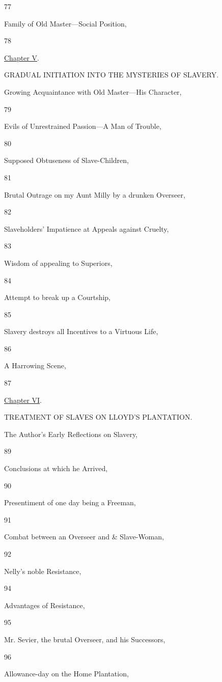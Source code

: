 77

Family of Old Master---Social Position,

78

\href{/wiki/My_Bondage_and_My_Freedom_(1855)/Chapter_V}{Chapter V}.

GRADUAL INITIATION INTO THE MYSTERIES OF SLAVERY.

Growing Acquaintance with Old Master---His Character,

79

Evils of Unrestrained Passion---A Man of Trouble,

80

Supposed Obtuseness of Slave-Children,

81

Brutal Outrage on my Aunt Milly by a drunken Overseer,

82

Slaveholders' Impatience at Appeals against Cruelty,

83

Wisdom of appealing to Superiors,

84

Attempt to break up a Courtship,

85

Slavery destroys all Incentives to a Virtuous Life,

86

A Harrowing Scene,

87

\href{/wiki/My_Bondage_and_My_Freedom_(1855)/Chapter_VI}{Chapter VI}.

TREATMENT OF SLAVES ON LLOYD'S PLANTATION.

The Author's Early Reflections on Slavery,

89

Conclusions at which he Arrived,

90

Presentiment of one day being a Freeman,

91

Combat between an Overseer and \& Slave-Woman,

92

Nelly's noble Resistance,

94

Advantages of Resistance,

95

Mr. Sevier, the brutal Overseer, and his Successors,

96

Allowance-day on the Home Plantation,

